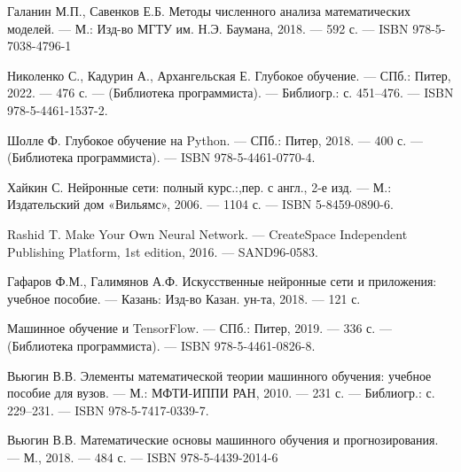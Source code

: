 \documentclass[12pt, a4paper]{article}
\begin{document}
\clearpage
\begin{thebibliography}{10}
	
	 Галанин М.П., Савенков Е.Б. Методы численного анализа математических моделей. — М.: Изд-во МГТУ им. Н.Э. Баумана, 2018. — 592 с. --- ISBN 978-5-7038-4796-1
	
	 Николенко С., Кадурин А., Архангельская Е. Глубокое обучение. — СПб.: Питер, 2022. — 476 с. — (Библиотека программиста). — Библиогр.: с. 451–476. — ISBN 978-5-4461-1537-2.
	
	 Шолле Ф. Глубокое обучение на Python. — СПб.: Питер, 2018. — 400 с. — (Библиотека программиста). — ISBN 978-5-4461-0770-4.
	
	  Хайкин С. Нейронные сети: полный курс.:,пер. с англ., 2-е изд. — М.: Издательский дом «Вильямс», 2006. — 1104 с. — ISBN 5-8459-0890-6.
	
	 Rashid T. Make Your Own Neural Network. — CreateSpace Independent Publishing Platform, 1st edition, 2016. — SAND96-0583.
	
	 Гафаров Ф.М., Галимянов А.Ф. Искусственные нейронные сети и приложения: учебное пособие. — Казань: Изд-во Казан. ун-та, 2018. — 121 с. 
	
	 Машинное обучение и TensorFlow. — СПб.: Питер, 2019. — 336 с. — (Библиотека программиста). — ISBN 978-5-4461-0826-8.
	
	
	 Вьюгин В.В. Элементы математической теории машинного обучения: учебное пособие для вузов. — М.: МФТИ-ИППИ РАН, 2010. — 231 с. — Библиогр.: с. 229–231. — ISBN 978-5-7417-0339-7.
	
	 Вьюгин В.В. Математические основы машинного обучения и прогнозирования. — М., 2018. — 484 с. --- ISBN 978-5-4439-2014-6
	
	
\end{thebibliography}
\end{document}
